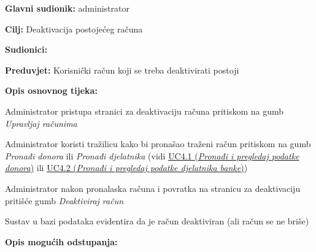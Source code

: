 					
					\noindent {}
					\begin{packed_item} \label{5.3}
	
						\item \textbf{Glavni sudionik: }administrator
						\item  \textbf{Cilj:} Deaktivacija postojećeg računa 
						\item  \textbf{Sudionici:} 
						\item  \textbf{Preduvjet:} Korisnički račun koji se treba deaktivirati postoji
						\item  \textbf{Opis osnovnog tijeka:}
						
						\item[] \begin{packed_enum}
	
	                        \item Administrator pristupa stranici za deaktivaciju računa pritiskom na gumb \textit{Upravljaj računima}
	                        \item Administrator koristi tražilicu kako bi pronašao traženi račun pritiskom na gumb \textit{Pronađi donora} ili \textit{Pronađi djelatnika} (vidi \hyperref[UC4.1]{UC4.1 (\textit{Pronađi i pregledaj podatke donora})} ili \hyperref[UC4.2]{UC4.2 (\textit{Pronađi i pregledaj podatke djelatnika banke})})
							\item Administrator nakon pronalaska računa i povratka na stranicu za deaktivaciju pritišće gumb \textit{Deaktiviraj račun}
	                        \item Sustav u bazi podataka evidentira da je račun deaktiviran (ali račun se ne briše)

						\end{packed_enum}
						
						\item  \textbf{Opis mogućih odstupanja:}
						
					\end{packed_item}
					
